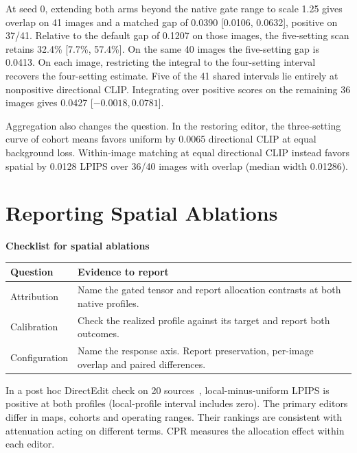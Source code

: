 \documentclass[10pt,doubleanonymous]{ieeeconf}
\begin{document}
At seed 0, extending both arms beyond the native gate range to scale 1.25 gives overlap on 41 images and a matched gap of 0.0390 [0.0106, 0.0632], positive on 37/41. Relative to the default gap of 0.1207 on those images, the five-setting scan retains 32.4\% [7.7\%, 57.4\%]. On the same 40 images the five-setting gap is 0.0413. On each image, restricting the integral to the four-setting interval recovers the four-setting estimate. Five of the 41 shared intervals lie entirely at nonpositive directional CLIP. Integrating over positive scores on the remaining 36 images gives 0.0427 [$-0.0018,0.0781$].



Aggregation also changes the question. In the restoring editor, the three-setting curve of cohort means favors uniform by 0.0065 directional CLIP at equal background loss. Within-image matching at equal directional CLIP instead favors spatial by 0.0128 LPIPS over 36/40 images with overlap (median width 0.01286). 

\section{Reporting Spatial Ablations}\label{sec:reporting}

\par\medskip\begin{nolinenumbers}\noindent\begin{minipage}{\columnwidth}\centering
\textbf{Checklist for spatial ablations}\par\smallskip
\begin{tabular}{@{}p{}p{}@{}}
\toprule
Question & Evidence to report\\\midrule
Attribution & Name the gated tensor and report allocation contrasts at both native profiles.\\
Calibration & Check the realized profile against its target and report both outcomes.\\
Configuration & Name the response axis. Report preservation, per-image overlap and paired differences.\\\bottomrule
\end{tabular}
\end{minipage}\par\end{nolinenumbers}\medskip

In a post hoc DirectEdit check on 20 sources~\cite{yang2026directedit}, local-minus-uniform LPIPS is positive at both profiles (local-profile interval includes zero). The primary editors differ in maps, cohorts and operating ranges. Their rankings are consistent with attenuation acting on different terms. CPR measures the allocation effect within each editor.
\end{document}
